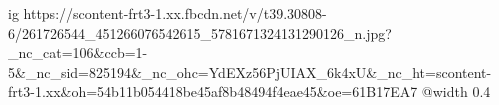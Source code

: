 
 
 
 
 

\ifcmt
  ig https://scontent-frt3-1.xx.fbcdn.net/v/t39.30808-6/261726544_451266076542615_5781671324131290126_n.jpg?_nc_cat=106&ccb=1-5&_nc_sid=825194&_nc_ohc=YdEXz56PjUIAX_6k4xU&_nc_ht=scontent-frt3-1.xx&oh=54b11b054418be45af8b48494f4eae45&oe=61B17EA7
  @width 0.4
\fi
